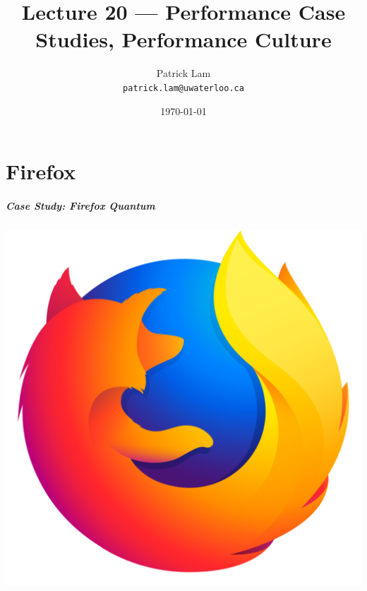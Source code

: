 

\title{Lecture 20 --- Performance Case Studies, Performance Culture}

\author{Patrick Lam \\ \small \texttt{patrick.lam@uwaterloo.ca}}
\date{\today}




\begin{frame}
  \titlepage

\end{frame}


\part{Firefox}

\begin{frame}
\frametitle{Case Study: Firefox Quantum}

\begin{center}
\includegraphics[width=.6\textwidth]{images/L19-logo-quantum.png}
\end{center}

\end{frame}

